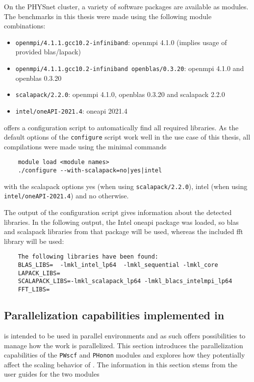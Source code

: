 \documentclass[main.tex]{subfiles}
\begin{document}
On the PHYSnet cluster, a variety of software packages are available as modules.
The benchmarks in this thesis were made using the following module combinations:
\begin{itemize}
    \item \texttt{openmpi/4.1.1.gcc10.2-infiniband}: \gls{openmpi} 4.1.0 (implies usage of \QE provided \gls{blas}/\gls{lapack})
    \item \texttt{openmpi/4.1.1.gcc10.2-infiniband openblas/0.3.20}: \gls{openmpi} 4.1.0 and \gls{openblas} 0.3.20
    \item \texttt{scalapack/2.2.0}: \gls{openmpi} 4.1.0, \gls{openblas} 0.3.20 and \gls{scalapack} 2.2.0
    \item \texttt{intel/oneAPI-2021.4}: \gls{oneapi} 2021.4
\end{itemize}

\QE offers a configuration script to automatically find all required libraries.
As the default options of the \texttt{configure} script work well in the use case of this thesis, all compilations were made using the minimal commands
\begin{verbatim}
    module load <module names>
    ./configure --with-scalapack=no|yes|intel
\end{verbatim}
with the scalapack options yes (when using \texttt{scalapack/2.2.0}), intel (when using \\ \texttt{intel/oneAPI-2021.4}) and no otherwise.

The output of the configuration script gives information about the detected libraries.
In the following output, the Intel \gls{oneapi} package was loaded, so \gls{blas} and \gls{scalapack} libraries from that package will be used, whereas the included \gls{fft} library will be used:
\begin{verbatim}
    The following libraries have been found:
    BLAS_LIBS=  -lmkl_intel_lp64  -lmkl_sequential -lmkl_core
    LAPACK_LIBS=
    SCALAPACK_LIBS=-lmkl_scalapack_lp64 -lmkl_blacs_intelmpi_lp64
    FFT_LIBS= 
\end{verbatim}

\subsection{Parallelization capabilities implemented in \QE}\label{sub:qe_parallelization}

\QE is intended to be used in parallel environments and as such offers possibilities to manage how the work is parallelized.
This section introduces the parallelization capabilities of the \texttt{PWscf} and \texttt{PHonon} modules and explores how they potentially affect the scaling behavior of \QE. The information in this section stems from the user guides for the two modules \cite{noauthor_pwscf_nodate, noauthor_phonon_nodate}
\end{document}
